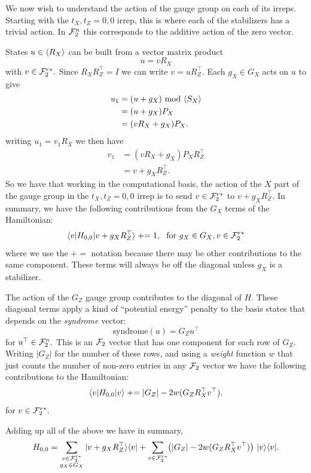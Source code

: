 We now wish to understand the action of the
gauge group on each of its irreps.
Starting with the $t_X,t_Z=0,0$ irrep,
this is where each of the stabilizers has
a trivial action. 
In $\mathcal{F}_2^n$ this
corresponds to the additive action of the zero vector.

\newcommand{\pluseq}{\mathrel{+}=}
States $u\in\langle R_X \rangle$ can be built from a
vector matrix product
$$
    u = v R_X
$$
with $v\in\mathcal{F}_2^{r*}.$
Since $R_X R_Z^\top = I$
we can write $v = u R_Z^\top.$
Each $g_X\in G_X$ acts on $u$ to give
\begin{align*}
    u_1 &= (u + g_X) \ \mbox{mod}\ \langle S_X \rangle \\
        &= (u + g_X) P_X \\
        &= (v R_X + g_X) P_X.
\end{align*}
writing $u_1 = v_1 R_X$ we then have
\begin{align*}
    v_1 &= (v R_X + g_X) P_X R_Z^\top \\
        &= v + g_X R_Z^\top.
\end{align*}
So we have that working in the computational
basis, the action of the $X$ part of the
gauge group in the $t_X,t_Z=0,0$ irrep is to send
$v\in \mathcal{F}_2^{r*}$ to $v + g_X R_Z^\top.$
In summary, we have the following contributions from the
$G_X$ terms of the Hamiltonian:
$$
    \bra{v} H_{0,0} \ket{v+g_X  R_Z^\top} 
        \pluseq 1,\ \ \mbox{for}\ g_X\in G_X, v\in \Frd
$$
where we use the $\pluseq$ notation
because there may be other contributions to the
same component.
These terms will always be off
the diagonal unless $g_X$ is a stabilizer.

The action of the $G_Z$ gauge group
contributes to the diagonal of $H.$
These diagonal terms apply a kind of
``potential energy'' penalty
to the basis states
that depends on the \emph{syndrome} vector:
$$
    \mbox{syndrome}(u) = G_Z u^\top
$$
for $u^\top \in \mathcal{F}_2^n.$
This is an $\mathcal{F}_2$ vector that has one component for
each row of $G_Z.$
Writing $|G_Z|$ for the number of these rows, and 
using a \emph{weight} function $w$ that just counts
the number of non-zero entries in any $\mathcal{F}_2$ vector
we have the following contributions to
the Hamiltonian:
$$
    \bra{v} H_{0,0} \ket{v} 
        \pluseq |G_Z| - 2w(G_Z R_X^\top v^\top),
$$
for $v\in \mathcal{F}_2^{r*}.$

Adding up all of the above we
have in summary,
$$
H_{0,0} = \sum_{\substack{v\in\mathcal{F}_2^{r*}\\g_X\in G_X } }
  |{v+g_X  R_Z^\top}\rangle\langle{v}| 
  + \sum_{v\in\mathcal{F}_2^{r*}} \bigl(|G_Z| - 2w(G_Z R_X^\top v^\top)
    \bigr) \ |{v}\rangle\langle{v}|.
$$

